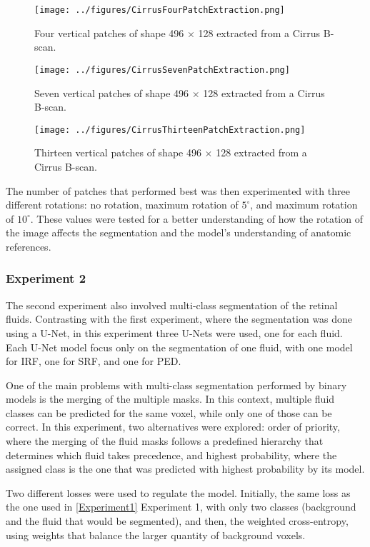 \begin{figure}[!ht]
	\centering
	\texttt{[image: ../figures/CirrusFourPatchExtraction.png]}
	\caption{Four vertical patches of shape 496 $\times$ 128 extracted from a Cirrus B-scan.}
	\label{fig:CirrusFourPatchExtraction}
\end{figure}

\begin{figure}[!ht]
	\centering
	\texttt{[image: ../figures/CirrusSevenPatchExtraction.png]}
	\caption{Seven vertical patches of shape 496 $\times$ 128 extracted from a Cirrus B-scan.}
	\label{fig:CirrusSevenPatchExtraction}
\end{figure}


\begin{figure}[!ht]
	\centering
	\texttt{[image: ../figures/CirrusThirteenPatchExtraction.png]}
	\caption{Thirteen vertical patches of shape 496 $\times$ 128 extracted from a Cirrus B-scan.}
	\label{fig:CirrusThirteenPatchExtraction}
\end{figure}

The number of patches that performed best was then experimented with three different rotations: no rotation, maximum rotation of $5^{\circ}$, and maximum rotation of $10^{\circ}$. These values were tested for a better understanding of how the rotation of the image affects the segmentation and the model's understanding of anatomic references.

\subsubsection{Experiment 2}\label{Experiment2}
The second experiment also involved multi-class segmentation of the retinal fluids. Contrasting with the first experiment, where the segmentation was done using a U-Net, in this experiment three U-Nets were used, one for each fluid. Each U-Net model focus only on the segmentation of one fluid, with one model for IRF, one for SRF, and one for PED.
\par
One of the main problems with multi-class segmentation performed by binary models is the merging of the multiple masks. In this context, multiple fluid classes can be predicted for the same voxel, while only one of those can be correct. In this experiment, two alternatives were explored: order of priority, where the merging of the fluid masks follows a predefined hierarchy that determines which fluid takes precedence, and highest probability, where the assigned class is the one that was predicted with highest probability by its model.
\par
Two different losses were used to regulate the model. Initially, the same loss as the one used in \ref{Experiment1} Experiment 1, with only two classes (background and the fluid that would be segmented), and then, the weighted cross-entropy, using weights that balance the larger quantity of background voxels.

